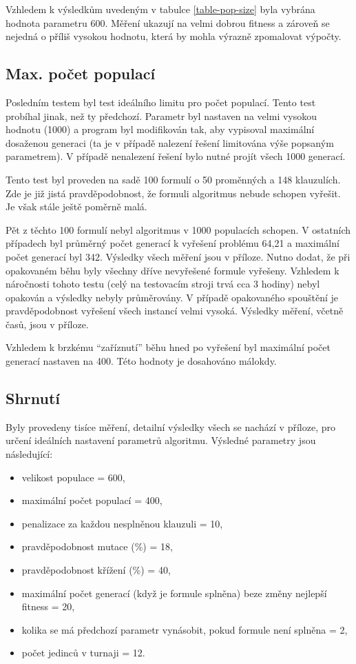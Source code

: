 \documentclass[a4paper]{article}
\begin{document}
		Vzhledem k výsledkům uvedeným v tabulce \ref{table-pop-size} byla vybrána hodnota parametru 600. Měření ukazují na velmi dobrou fitness a zároveň se nejedná o příliš vysokou hodnotu, která by mohla výrazně zpomalovat výpočty.
	
	\subsection{Max. počet populací}
		Posledním testem byl test ideálního limitu pro počet populací. Tento test probíhal jinak, než ty předchozí. Parametr byl nastaven na velmi vysokou hodnotu (1000) a program byl modifikován tak, aby vypisoval maximální dosaženou generaci (ta je v případě nalezení řešení limitována výše popsaným parametrem). V případě nenalezení řešení bylo nutné projít všech 1000 generací.	
		
		Tento test byl proveden na sadě 100 formulí o 50 proměnných a 148 klauzulích. Zde je již jistá pravděpodobnost, že formuli algoritmus nebude schopen vyřešit. Je však stále ještě poměrně malá.
		
	Pět z těchto 100 formulí nebyl algoritmus v 1000 populacích schopen. V ostatních případech byl průměrný počet generací k vyřešení problému 64,21 a maximální počet generací byl 342. Výsledky všech měření jsou v příloze. Nutno dodat, že při opakovaném běhu byly všechny dříve nevyřešené formule vyřešeny. Vzhledem k náročnosti tohoto testu (celý na testovacím stroji trvá cca 3 hodiny) nebyl opakován a výsledky nebyly průměrovány. V případě opakovaného spouštění je pravděpodobnost vyřešení všech instancí velmi vysoká. Výsledky měření, včetně časů, jsou v příloze.
	
	Vzhledem k brzkému \enquote{zaříznutí} běhu hned po vyřešení byl maximální počet generací nastaven na 400. Této hodnoty je dosahováno málokdy.
	
	\subsection{Shrnutí}
		Byly provedeny tisíce měření, detailní výsledky všech se nachází v příloze, pro určení ideálních nastavení parametrů algoritmu. Výsledné parametry jsou následující:
		\begin{itemize}
		\item velikost populace = 600,
		\item maximální počet populací = 400,
		\item penalizace za každou nesplněnou klauzuli = 10,
		\item pravděpodobnost mutace (\%) = 18,
		\item pravděpodobnost křížení (\%) = 40,
		\item maximální počet generací (když je formule splněna) beze změny nejlepší fitness = 20,
		\item kolika se má předchozí parametr vynásobit, pokud formule není splněna = 2,
		\item počet jedinců v turnaji = 12.
	\end{itemize}
	
\end{document}
